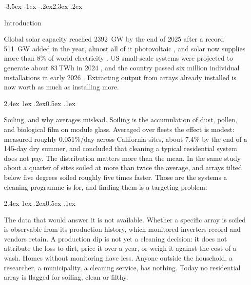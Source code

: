 \documentclass[10pt,twocolumn]{article}
\makeatletter
\renewcommand\section{\@startsection{section}{1}{\z@}%
  {-3.5ex \@plus -1ex \@minus -.2ex}{2.3ex \@plus.2ex}%
  {\normalfont\Large\bfseries\raggedright}}
\renewcommand\paragraph{\@startsection{paragraph}{4}{\z@}%
  {2.4ex \@plus1ex \@minus.2ex}{0.5ex \@plus .1ex}%
  {\normalfont\normalsize\bfseries\raggedright}}
\makeatother
\begin{document}
\vfill
\clearpage
\twocolumn

\section{Introduction}
\label{sec:intro}

Global solar capacity reached \SI{2392}{\giga\watt} by the end of 2025 after a record
\SI{511}{\giga\watt} added in the year, almost all of it photovoltaic \cite{irena2026}, and solar now
supplies more than 8\% of world electricity \cite{iea2026}. US small-scale systems were
projected to generate about 83\,TWh in 2024 \cite{eia2023}, and the
country passed six million individual installations in early 2026 \cite{seia2026}.
Extracting output from arrays already installed is now worth as much as installing more.

\paragraph{Soiling, and why averages mislead.}
Soiling is the accumulation of dust, pollen, and biological film on module glass.
Averaged over fleets the effect is modest: \citet{mejia2013} measured roughly
0.051\%/day across California sites, about 7.4\% by the end of a 145-day dry summer, and
concluded that cleaning a typical residential system does not pay. The distribution
matters more than the mean. In the same study about a quarter of sites soiled at more
than twice the average, and arrays tilted below five degrees soiled roughly five times
faster. Those are the systems a cleaning programme is for, and finding them is a
targeting problem.

\paragraph{The data that would answer it is not available.}
Whether a specific array is soiled is observable from its production history, which
monitored inverters record and vendors retain. A production dip is not yet a cleaning
decision: it does not attribute the loss to dirt, price it over a year, or weigh it
against the cost of a wash. Homes without monitoring have less. Anyone outside the
household, a researcher, a municipality, a cleaning service, has nothing. Today no
residential array is flagged for soiling, clean or filthy.
\end{document}
